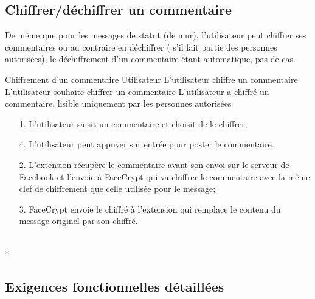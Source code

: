 \documentclass[a4paper,11pt,french]{article}
\begin{document}
\subsection{Chiffrer/déchiffrer un commentaire}
De même que pour les messages de statut (de mur), l'utilisateur
peut chiffrer ses commentaires ou au contraire en déchiffrer (
s'il fait partie des personnes autorisées), le déchiffrement d'un commentaire
étant automatique, pas de cas.

\fiche
	{Chiffrement d'un commentaire}
	{Utilisateur}
	{L'utilisateur chiffre un commentaire}
	{}
	{L'utilisateur souhaite chiffrer un commentaire}
	{L'utilisateur a chiffré un commentaire, lisible uniquement par les 
	personnes autorisées}
	{\begin{itemize}
	    \item[]
	  \item[1.] L'utilisateur saisit un commentaire et choisit de le chiffrer;
      \item[4.] L'utilisateur peut appuyer sur entrée pour poster le 
      commentaire.
	\end{itemize}
	}
	{\begin{itemize}
        \item[]
		\item[2.] L'extension récupère le commentaire avant son envoi sur le 
            serveur de Facebook et l'envoie à FaceCrypt qui va chiffrer le 
            commentaire avec la même clef de chiffrement que celle utilisée pour
            le message;
		\item[3.] FaceCrypt envoie le chiffré à l'extension qui remplace le
        contenu du message originel par son chiffré.
	\end{itemize}
	}
	{}
\flots
    {}
	{}    
\\*

\subsection{Exigences fonctionnelles détaillées}

\end{document}
